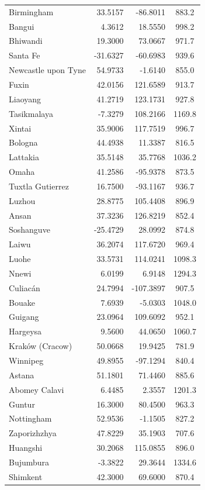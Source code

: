 \begin{longtable}{lrrc}
Birmingham & 33.5157 & -86.8011 & 883.2 \\
Bangui & 4.3612 & 18.5550 & 998.2 \\
Bhiwandi & 19.3000 & 73.0667 & 971.7 \\
Santa Fe & -31.6327 & -60.6983 & 939.6 \\
Newcastle upon Tyne & 54.9733 & -1.6140 & 855.0 \\
Fuxin & 42.0156 & 121.6589 & 913.7 \\
Liaoyang & 41.2719 & 123.1731 & 927.8 \\
Tasikmalaya & -7.3279 & 108.2166 & 1169.8 \\
Xintai & 35.9006 & 117.7519 & 996.7 \\
Bologna & 44.4938 & 11.3387 & 816.5 \\
Lattakia & 35.5148 & 35.7768 & 1036.2 \\
Omaha & 41.2586 & -95.9378 & 873.5 \\
Tuxtla Gutierrez & 16.7500 & -93.1167 & 936.7 \\
Luzhou & 28.8775 & 105.4408 & 896.9 \\
Ansan & 37.3236 & 126.8219 & 852.4 \\
Soshanguve & -25.4729 & 28.0992 & 874.8 \\
Laiwu & 36.2074 & 117.6720 & 969.4 \\
Luohe & 33.5731 & 114.0241 & 1098.3 \\
Nnewi & 6.0199 & 6.9148 & 1294.3 \\
Culiacán & 24.7994 & -107.3897 & 907.5 \\
Bouake & 7.6939 & -5.0303 & 1048.0 \\
Guigang & 23.0964 & 109.6092 & 952.1 \\
Hargeysa & 9.5600 & 44.0650 & 1060.7 \\
Kraków (Cracow) & 50.0668 & 19.9425 & 781.9 \\
Winnipeg & 49.8955 & -97.1294 & 840.4 \\
Astana & 51.1801 & 71.4460 & 885.6 \\
Abomey Calavi & 6.4485 & 2.3557 & 1201.3 \\
Guntur & 16.3000 & 80.4500 & 963.3 \\
Nottingham & 52.9536 & -1.1505 & 827.2 \\
Zaporizhzhya & 47.8229 & 35.1903 & 707.6 \\
Huangshi & 30.2068 & 115.0855 & 896.0 \\
Bujumbura & -3.3822 & 29.3644 & 1334.6 \\
Shimkent & 42.3000 & 69.6000 & 870.4 \\

\end{longtable}
